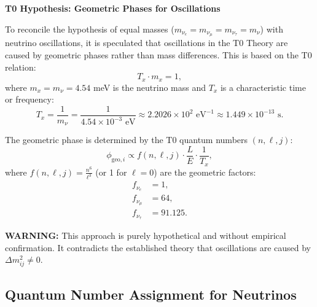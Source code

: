 	\begin{speculation}
		\textbf{T0 Hypothesis: Geometric Phases for Oscillations}
		
		To reconcile the hypothesis of equal masses ($m_{\nu_e} = m_{\nu_\mu} = m_{\nu_\tau} = m_\nu$) with neutrino oscillations, it is speculated that oscillations in the T0 Theory are caused by geometric phases rather than mass differences. This is based on the T0 relation:
		\[
		T_x \cdot m_x = 1,
		\]
		where $m_x = m_\nu = 4.54$ meV is the neutrino mass and $T_x$ is a characteristic time or frequency:
		\[
		T_x = \frac{1}{m_\nu} = \frac{1}{4.54 \times 10^{-3} \text{ eV}} \approx 2.2026 \times 10^2 \text{ eV}^{-1} \approx 1.449 \times 10^{-13} \text{ s}.
		\]
		
		The geometric phase is determined by the T0 quantum numbers $(n, \ell, j)$:
		\[
		\phi_{\text{geo}, i} \propto f(n, \ell, j) \cdot \frac{L}{E} \cdot \frac{1}{T_x},
		\]
		where $f(n, \ell, j) = \frac{n^6}{\ell^3}$ (or 1 for $\ell = 0$) are the geometric factors:
		\begin{align}
			f_{\nu_e} &= 1, \\
			f_{\nu_\mu} &= 64, \\
			f_{\nu_\tau} &= 91.125.
		\end{align}
		
		\textbf{WARNING:} This approach is purely hypothetical and without empirical confirmation. It contradicts the established theory that oscillations are caused by $\Delta m^2_{ij} \neq 0$.
	\end{speculation}
	
	\subsection{Quantum Number Assignment for Neutrinos}
	
	\begin{table}[h]
		\centering
		\caption{Speculative T0 Quantum Numbers for Neutrino Flavors}
	\end{table}
	
